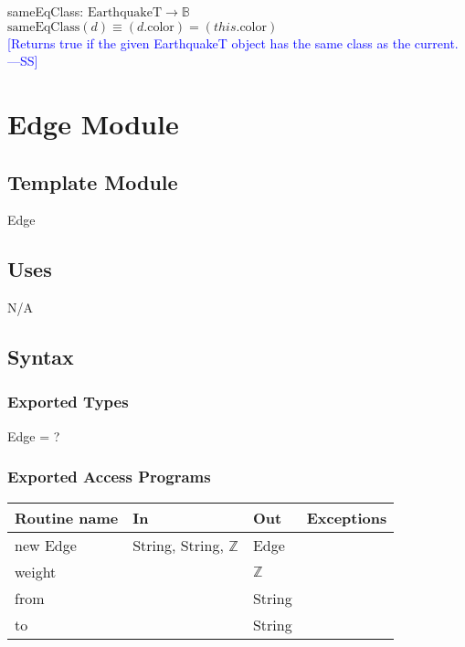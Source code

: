 \documentclass[12pt]{article}
\newcommand{\authornote}[3]{\textcolor{#1}{[#3 ---#2]}}
\newcommand{\authornote}[3]{}
\newcommand{\wss}[1]{\authornote{blue}{SS}{#1}}
\begin{document}
\noindent sameEqClass: $\mbox{EarthquakeT} \rightarrow \mathbb{B}$\\
$\mbox{sameEqClass}(d) \equiv (d.\mbox{color}) = (this.\mbox{color})$\\
\noindent \wss{Returns true if the given EarthquakeT object has the same class as the current.}\\




\newpage

\section* {Edge Module}

\subsection* {Template Module}

Edge

\subsection* {Uses}

N/A

\subsection* {Syntax}

\subsubsection* {Exported Types}

Edge = ?


\subsubsection* {Exported Access Programs}

\begin{tabular}{| l | l | l | p{6cm} |}
\hline
\textbf{Routine name} & \textbf{In} & \textbf{Out} & \textbf{Exceptions}\\
\hline
new Edge & String, String, $\mathbb{Z}$ & Edge & \\
\hline
weight & ~ & $\mathbb{Z}$ & \\
\hline
from & ~ & String & \\
\hline
to & ~ & String & \\
\hline
\end{tabular}
\end{document}
